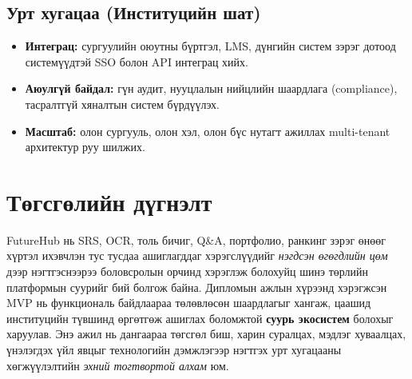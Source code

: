 \subsection{Урт хугацаа (Институцийн шат)}
\begin{itemize}[leftmargin=2em]
    \item \textbf{Интеграц:} сургуулийн оюутны бүртгэл, LMS, дүнгийн систем зэрэг дотоод системүүдтэй SSO болон API интеграц хийх.
    \item \textbf{Аюулгүй байдал:} гүн аудит, нууцлалын нийцлийн шаардлага (compliance), тасралтгүй хяналтын систем бүрдүүлэх.
    \item \textbf{Масштаб:} олон сургууль, олон хэл, олон бүс нутагт ажиллах multi-tenant архитектур руу шилжих.
\end{itemize}





\section{Төгсгөлийн дүгнэлт}

FutureHub нь SRS, OCR, толь бичиг, Q\&A, портфолио, ранкинг зэрэг өнөөг хүртэл ихэвчлэн тус тусдаа ашиглагддаг хэрэгслүүдийг \textit{нэгдсэн өгөгдлийн цөм} дээр нэгтгэснээрээ боловсролын орчинд хэрэглэж болохуйц шинэ төрлийн платформын суурийг бий болгож байна. Дипломын ажлын хүрээнд хэрэгжсэн MVP нь функциональ байдлаараа төлөвлөсөн шаардлагыг хангаж, цаашид институцийн түвшинд өргөтгөж ашиглах боломжтой \textbf{суурь экосистем} болохыг харуулав. Энэ ажил нь дангаараа төгсгөл биш, харин суралцах, мэдлэг хуваалцах, үнэлэгдэх үйл явцыг технологийн дэмжлэгээр нэгтгэх урт хугацааны хөгжүүлэлтийн \textit{эхний тогтвортой алхам} юм.
